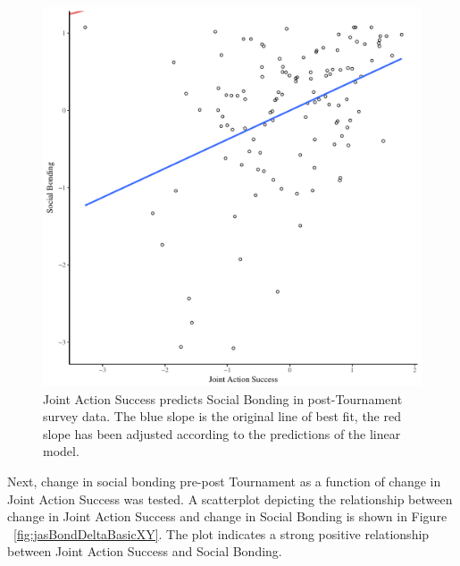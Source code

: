 \begin{landscape}
  \begin{figure}[htbp]
  \includegraphics[width = \linewidth]{images/jasBondModelSlope.pdf}
    \caption{Joint Action Success predicts Social Bonding in post-Tournament survey data. The blue slope is the original line of best fit, the red slope has been adjusted according to the predictions of the linear model.}
    \label{fig:jasBondModelSlope}
  \end{figure}








Next, change in social bonding pre-post Tournament as a function of change in Joint Action Success was tested. A scatterplot depicting the relationship between change in Joint Action Success and change in Social Bonding is shown in Figure ~\ref{fig:jasBondDeltaBasicXY}. The plot indicates a strong positive relationship between Joint Action Success and Social Bonding.


\end{landscape}
